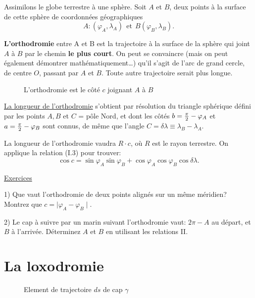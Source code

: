 \documentclass[12pt]{report}
\begin{document}
Assimilons le globe terrestre à une sphère.
Soit $A$ et $B$, deux points à la surface de cette sphère de coordonnées géographiques
\[
A:(\varphi_A,\lambda_A) \  \ \mbox{et} \  \ B (\varphi_B, \lambda_B).
\]


\textbf{L'orthodromie} entre A et B est la trajectoire à la surface de la sphère qui joint $A$ à $B$ par le chemin \textbf{le plus court}. On peut se convaincre (mais on peut également démontrer mathématiquement\ldots) qu'il s'agit de l'arc de grand cercle, de centre $O$, passant par $A$ et $B$. Toute autre trajectoire serait plus longue.

\begin{figure}[ht]
\begin{center}
\end{center}
\caption{L'orthodromie est le côté $c$ joignant $A$ à $B$}
\label{fig:10}
\end{figure}



\underline{La longueur de l'orthodromie} s'obtient par résolution du triangle sphérique défini par les points $A,B$ et $C$ = pôle Nord, et dont les côtés $b={\pi\over 2}-\varphi_A$ et $a={\pi\over 2}-\varphi_B$ sont connus, de même que l'angle $C=\delta \lambda \equiv \lambda_B-\lambda_A$.

La longueur de l'orthodromie vaudra $R\cdot c$, où $R$ est le rayon terrestre. On applique la relation (I.3) pour trouver:
\[
\cos c = \sin \varphi_A \sin \varphi_B + \cos \varphi_A \cos \varphi_B \cos \delta \lambda.
\]


\bigskip\bigskip


\underline{Exercices}

1) Que vaut l'orthodromie de deux points alignés sur un même méridien? Montrez que $c=\mid \varphi_A - \varphi_B\mid$.

2) Le cap à suivre par un marin suivant l'orthodromie vaut: $2\pi-A$ au départ, et $B$ à l'arrivée. Déterminez $A$ et $B$ en utilisant les relations II.


 
\section{La loxodromie} 

\begin{figure}[ht]
\begin{center}
\end{center}
\caption{Element de trajectoire $ds$ de cap $\gamma$}
\label{fig:11}
\end{figure}
\end{document}
